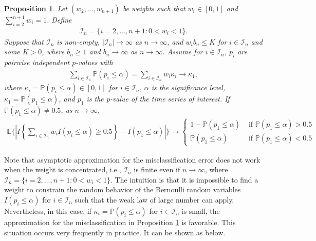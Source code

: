 \documentclass[11pt]{article}
\def\mc#1{\mathcal{#1}} %
\def\E{\mathbb{E}} %
\def\mc#1{\mathcal{#1}}
\def\P{\mathbb{P}}
\newtheorem{prop}{Proposition}
\theoremstyle{definition}
\begin{document}
\begin{prop}
\label{votprop2}Let $(w_2, \ldots, w_{n+1})$ be weights such that $w_i \in [0,1]$ and $\sum_{i=2}^{n+1} w_i=1$. Define
\begin{align*}
  \mc{I}_n = \{i =  2,\ldots, n+1\colon 0< w_i < 1\}.
\end{align*}
Suppose that  $\mc{I}_n$  is non-empty, $|\mc{I}_n| \to \infty$ as $n \to \infty$, and $w_i b_n\leq K$ for $i\in \mc{I}_n$ and some $K>0$, where $b_n \geq 1$ and $b_n \to \infty$ as $n\to \infty$. Assume for $i \in \mc{I}_n$,  $p_i$ are pairwise independent $p$-values  with 
\begin{align*}
  \sum_{i\in \mc{I}_n}\P(p_i \leq \alpha) = \sum_{i\in \mc{I}_n} w_i \kappa_i \to \kappa_{1},
\end{align*}
where $\kappa_i =  \P(p_i \leq \alpha)\in [0,1]$ for $i \in \mc{I}_n$, $\alpha$ is the significance level, $\kappa_1 = \P(p_1 \leq \alpha)$, and  $p_1$ is the p-value of the time series of interest. If $\P(p_1 \leq \alpha) \neq 0.5$, as $n\to \infty$, 
\begin{align*}
  \E \bigg\{\left|I\left\{ \sum_{i\in \mc{I}_n} w_i I(p_i \leq  \alpha) \geq 0.5\right\}
  - I( p_1 \leq  \alpha) \right|\bigg\}
  \to  \begin{cases}
    1- \P(p_1 \leq \alpha) & \text{ if } \P(p_1 \leq \alpha) > 0.5 \\
    \P(p_1 \leq \alpha) & \text{ if } \P(p_1 \leq \alpha) < 0.5 
  \end{cases}
\end{align*}
\end{prop}



Note that asymptotic approximation for the misclassification error does not work when the weight is concentrated, i.e., $\mc{I}_n$ is finite even if $n\to \infty$, where $\mc{I}_n = \{i =  2,\ldots, n+1\colon 0< w_i < 1\}$. The intuition is that  it is impossible to find a weight to constrain the random behavior of the Bernoulli random variables $I(p_i\leq \alpha)$ for $i \in \mc{I}_n$ such that the weak law of large number can apply.  Nevertheless, in this case, if $\kappa_i = \P(p_i\leq \alpha)$ for $i\in \mc{I}_n$ is small, the approximation for the misclassification in Proposition \ref{votprop2} is favorable. This situation occurs very frequently in practice. It can be shown as below.
\end{document}
